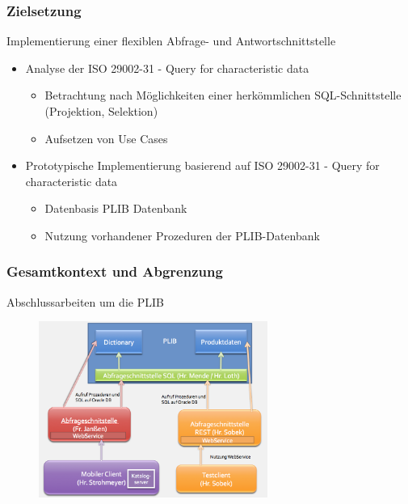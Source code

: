 \documentclass[serif,mathserif]{beamer}
\begin{document}
\begin{frame}
  \frametitle{Zielsetzung}
  Implementierung einer flexiblen Abfrage- und Antwortschnittstelle \pause
  \begin{itemize}
  \item Analyse der ISO 29002-31 - Query for characteristic data\pause
     \begin{itemize}
     \item Betrachtung nach Möglichkeiten einer herkömmlichen SQL-Schnittstelle (Projektion, Selektion)\pause
     \item Aufsetzen von Use Cases\pause
     \end{itemize}
  \item Prototypische Implementierung basierend auf ISO 29002-31 - Query for characteristic data\pause
      \begin{itemize}
      \item Datenbasis PLIB Datenbank\pause
      \item Nutzung vorhandener Prozeduren der PLIB-Datenbank
      \end{itemize}
  \end{itemize}
\end{frame}

\begin{frame}
  \frametitle{Gesamtkontext und Abgrenzung}
    Abschlussarbeiten um die PLIB
  \begin{figure}[t]
    \includegraphics[width=7.5cm]{images/gesamtkontext_plib.png}
  \end{figure}
\end{frame}
\end{document}
